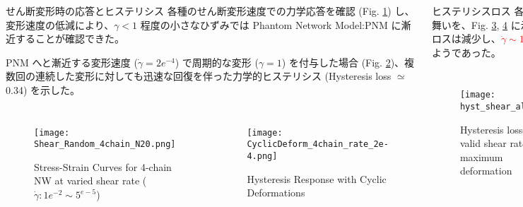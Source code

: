 \begin{columns}[totalwidth=.85\linewidth]
	\column{\textwidth}
	\vspace{-10mm}
		\begin{itembox}[l]{せん断変形時の応答とヒステリシス}
			各種のせん断変形速度での力学応答を確認 (Fig. \ref{deform}) し、変形速度の低減により、$\gamma<1$ 程度の小さなひずみでは Phantom Network Model:PNM に漸近することが確認できた。

			PNM へと漸近する変形速度 ($\dot{\gamma} = 2e^{-4}$) で周期的な変形 ($\gamma = 1$) を付与した場合 (Fig. \ref{cyclic})、複数回の連続した変形に対しても迅速な回復を伴った力学的ヒステリシス (Hysteresis loss $\simeq$ 0.34) を示した。
			\begin{columns}[totalwidth=\linewidth]
				\begin{figure}[htb]
					\centering
						\texttt{[image: Shear\_Random\_4chain\_N20.png]}
						\caption{Stress-Strain Curves for 4-chain NW at varied shear rate ($\dot{\gamma}: 1e^{-2} \sim 5^{e-5}$)}
						\label{deform}
				\end{figure}
				\begin{figure}[htb]
					\centering
						\texttt{[image: CyclicDeform\_4chain\_rate\_2e-4.png]}
						\caption{Hysteresis Response with Cyclic Deformations}
						\label{cyclic}
				\end{figure}
				\end{columns}
		\end{itembox}

		\begin{itembox}[l]{ヒステリシスロス}
			各種の変形条件での力学的ヒステリシスの振る舞いを、Fig. \ref{hystall}, \ref{hystallcomp} に示した。
			変形速度の低下に伴いヒステリシスロスは減少し、\textcolor{red}{$\dot{\gamma} \sim 1e^{-5}$ 程度のオーダーの時間スケールで消失}するようであった。
			\begin{columns}[totalwidth=\linewidth]
					\begin{figure}[htb]
						\centering
							\texttt{[image: hyst\_shear\_all.png]}
							\caption{Hysteresis losses for valid shear rate and maximum deformation}
							\label{hystall}
					\end{figure}
				\begin{figure}[htb]
					\centering
						\texttt{[image: hyst\_shear.png]}
						\caption{Comparison of Hysteresis losses}
						\label{hystallcomp}
				\end{figure}
				\end{columns}
		\end{itembox}


\end{columns}
